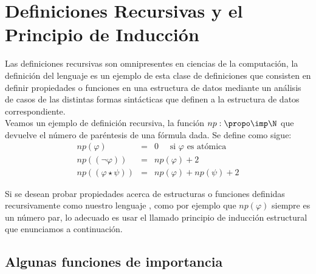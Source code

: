 \documentclass[11pt,letterpaper]{article}
\begin{document}
\section{Definiciones Recursivas y el Principio de Inducción}

Las definiciones recursivas son omnipresentes en ciencias de la computación, 
la definición del lenguaje {\propo} es un ejemplo de esta clase de definiciones
que consisten en definir propiedades o funciones en una estructura de datos
mediante un análisis de casos de las distintas formas sintácticas que definen a 
la estructura de datos correspondiente.\\

Veamos un ejemplo de definición recursiva, la función $np:\propo\imp\N$ que 
devuelve el número de paréntesis de una fórmula dada. Se define como sigue:
\[
\begin{array}{rll}
np(\varphi) & = & 0\quad \text{ si }\varphi \text{ es atómica }\\
np((\neg\varphi)) & = & np(\varphi)+2\\
np((\varphi\star\psi)) & = & np(\varphi)+np(\psi)+2
\end{array}
\]

Si se desean probar propiedades acerca de estructuras o funciones definidas
recursivamente como nuestro lenguaje {\propo}, como por ejemplo que 
$np(\varphi)$ siempre es un n\'umero par, lo adecuado es usar el llamado
principio de inducción estructural que enunciamos a continuación.


\subsection{Algunas funciones de importancia}
\end{document}
